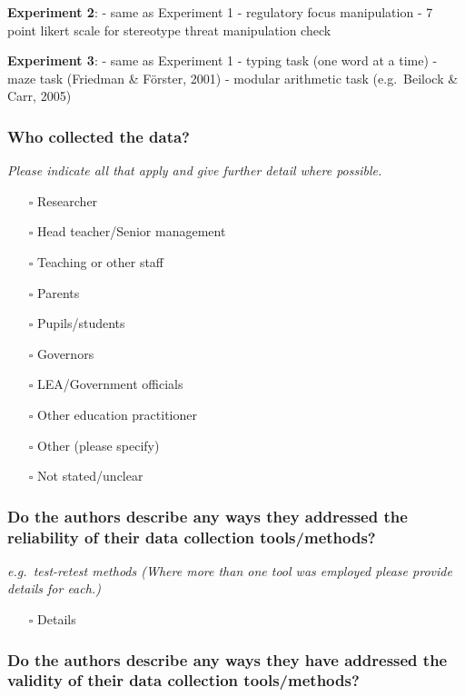 \documentclass[
  doc, a4paper]{apa7}
\providecommand{\tightlist}{%
  \setlength{\itemsep}{0pt}\setlength{\parskip}{0pt}}
\begin{document}
\textbf{Experiment 2}:
- same as Experiment 1
- regulatory focus manipulation
- 7 point likert scale for stereotype threat manipulation check

\textbf{Experiment 3}:
- same as Experiment 1
- typing task (one word at a time)
- maze task (Friedman \& Förster, 2001)
- modular arithmetic task (e.g.~Beilock \& Carr, 2005)

\subsubsection{Who collected the data?}\label{who-collected-the-data}

\emph{Please indicate all that apply and give further detail where possible.}

\begin{itemize}
\tightlist
\item[$\square$]
  Researcher
\item[$\square$]
  Head teacher/Senior management
\item[$\square$]
  Teaching or other staff
\item[$\square$]
  Parents
\item[$\square$]
  Pupils/students
\item[$\square$]
  Governors
\item[$\square$]
  LEA/Government officials
\item[$\square$]
  Other education practitioner
\item[$\square$]
  Other (please specify)
\item[$\square$]
  Not stated/unclear
\end{itemize}

\subsubsection{Do the authors describe any ways they addressed the reliability of their data collection tools/methods?}\label{do-the-authors-describe-any-ways-they-addressed-the-reliability-of-their-data-collection-toolsmethods}

\emph{e.g.~test-retest methods (Where more than one tool was employed please provide details for each.)}

\begin{itemize}
\tightlist
\item[$\square$]
  Details
\end{itemize}

\subsubsection{Do the authors describe any ways they have addressed the validity of their data collection tools/methods?}\label{do-the-authors-describe-any-ways-they-have-addressed-the-validity-of-their-data-collection-toolsmethods}
\end{document}
